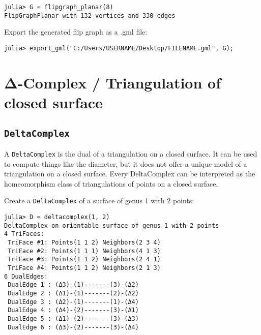 \begin{verbatim}
julia> G = flipgraph_planar(8)
FlipGraphPlanar with 132 vertices and 330 edges
\end{verbatim}



Export the generated flip graph as a .gml file:




\begin{verbatim}
julia> export_gml("C:/Users/USERNAME/Desktop/FILENAME.gml", G);
\end{verbatim}



\section{Δ-Complex / Triangulation of closed surface}



\label{2167686298267499854}{}


\subsection{\texttt{DeltaComplex}}



\label{13627494553398038653}{}


A \texttt{DeltaComplex} is the dual of a triangulation on a closed surface. It can be used to compute things like the diameter, but it does not offer a unique model of a triangulation on a closed surface.  Every DeltaComplex can be interpreted as the homeomorphism class of triangulations of points on a closed surface.



Create a \texttt{DeltaComplex} of a surface of genus 1 with 2 points:




\begin{verbatim}
julia> D = deltacomplex(1, 2)
DeltaComplex on orientable surface of genus 1 with 2 points
4 TriFaces:
 TriFace #1: Points(1 1 2) Neighbors(2 3 4)
 TriFace #2: Points(1 1 1) Neighbors(4 1 3)
 TriFace #3: Points(1 1 2) Neighbors(2 4 1)
 TriFace #4: Points(1 1 2) Neighbors(2 1 3)
6 DualEdges:
 DualEdge 1 : (Δ3)-(1)-------(3)-(Δ2)
 DualEdge 2 : (Δ1)-(1)-------(2)-(Δ2)
 DualEdge 3 : (Δ2)-(1)-------(1)-(Δ4)
 DualEdge 4 : (Δ4)-(2)-------(3)-(Δ1)
 DualEdge 5 : (Δ1)-(2)-------(3)-(Δ3)
 DualEdge 6 : (Δ3)-(2)-------(3)-(Δ4)
\end{verbatim}



